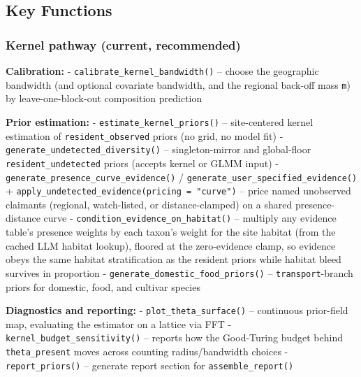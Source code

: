\documentclass[
]{article}
\newenvironment{Shaded}{\begin{snugshade}}{\end{snugshade}}
\newcommand{\AttributeTok}[1]{\textcolor[rgb]{0.13,0.29,0.53}{#1}}
\newcommand{\CommentTok}[1]{\textcolor[rgb]{0.56,0.35,0.01}{\textit{#1}}}
\newcommand{\FunctionTok}[1]{\textcolor[rgb]{0.13,0.29,0.53}{\textbf{#1}}}
\newcommand{\NormalTok}[1]{#1}
\newcommand{\OtherTok}[1]{\textcolor[rgb]{0.56,0.35,0.01}{#1}}
\newcommand{\SpecialCharTok}[1]{\textcolor[rgb]{0.81,0.36,0.00}{\textbf{#1}}}
\newcommand{\StringTok}[1]{\textcolor[rgb]{0.31,0.60,0.02}{#1}}
\begin{document}
\begin{Shaded}
\end{Shaded}

\subsection{Key Functions}\label{key-functions}

\subsubsection{Kernel pathway (current,
recommended)}\label{kernel-pathway-current-recommended}

\textbf{Calibration:} - \texttt{calibrate\_kernel\_bandwidth()} --
choose the geographic bandwidth (and optional covariate bandwidth, and
the regional back-off mass \texttt{m}) by leave-one-block-out
composition prediction

\textbf{Prior estimation:} - \texttt{estimate\_kernel\_priors()} --
site-centered kernel estimation of \texttt{resident\_observed} priors
(no grid, no model fit) - \texttt{generate\_undetected\_diversity()} --
singleton-mirror and global-floor \texttt{resident\_undetected} priors
(accepts kernel or GLMM input) -
\texttt{generate\_presence\_curve\_evidence()} /
\texttt{generate\_user\_specified\_evidence()} +
\texttt{apply\_undetected\_evidence(pricing\ =\ "curve")} -- price named
unobserved claimants (regional, watch-listed, or distance-clamped) on a
shared presence-distance curve -
\texttt{condition\_evidence\_on\_habitat()} -- multiply any evidence
table's presence weights by each taxon's weight for the site habitat
(from the cached LLM habitat lookup), floored at the zero-evidence
clamp, so evidence obeys the same habitat stratification as the resident
priors while habitat bleed survives in proportion -
\texttt{generate\_domestic\_food\_priors()} -- \texttt{transport}-branch
priors for domestic, food, and cultivar species

\textbf{Diagnostics and reporting:} - \texttt{plot\_theta\_surface()} --
continuous prior-field map, evaluating the estimator on a lattice via
FFT - \texttt{kernel\_budget\_sensitivity()} -- reports how the
Good-Turing budget behind \texttt{theta\_present} moves across counting
radius/bandwidth choices - \texttt{report\_priors()} -- generate report
section for \texttt{assemble\_report()}
\end{document}
